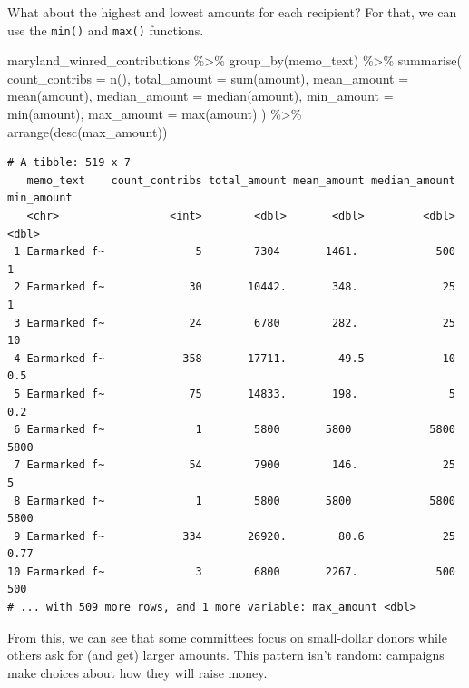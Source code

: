 \documentclass[
  letterpaper,
  DIV=11,
  numbers=noendperiod]{scrreprt}
\newenvironment{Shaded}{\begin{snugshade}}{\end{snugshade}}
\newcommand{\AttributeTok}[1]{\textcolor[rgb]{0.40,0.45,0.13}{#1}}
\newcommand{\FunctionTok}[1]{\textcolor[rgb]{0.28,0.35,0.67}{#1}}
\newcommand{\NormalTok}[1]{\textcolor[rgb]{0.00,0.23,0.31}{#1}}
\newcommand{\SpecialCharTok}[1]{\textcolor[rgb]{0.37,0.37,0.37}{#1}}
\begin{document}
What about the highest and lowest amounts for each recipient? For that,
we can use the \texttt{min()} and \texttt{max()} functions.

\begin{Shaded}
\begin{Highlighting}[]
\NormalTok{maryland\_winred\_contributions }\SpecialCharTok{\%\textgreater{}\%}
  \FunctionTok{group\_by}\NormalTok{(memo\_text) }\SpecialCharTok{\%\textgreater{}\%}
  \FunctionTok{summarise}\NormalTok{(}
    \AttributeTok{count\_contribs =} \FunctionTok{n}\NormalTok{(),}
    \AttributeTok{total\_amount =} \FunctionTok{sum}\NormalTok{(amount),}
    \AttributeTok{mean\_amount =} \FunctionTok{mean}\NormalTok{(amount),}
    \AttributeTok{median\_amount =} \FunctionTok{median}\NormalTok{(amount),}
    \AttributeTok{min\_amount =} \FunctionTok{min}\NormalTok{(amount),}
    \AttributeTok{max\_amount =} \FunctionTok{max}\NormalTok{(amount)}
\NormalTok{  ) }\SpecialCharTok{\%\textgreater{}\%}
  \FunctionTok{arrange}\NormalTok{(}\FunctionTok{desc}\NormalTok{(max\_amount))}
\end{Highlighting}
\end{Shaded}

\begin{verbatim}
# A tibble: 519 x 7
   memo_text    count_contribs total_amount mean_amount median_amount min_amount
   <chr>                 <int>        <dbl>       <dbl>         <dbl>      <dbl>
 1 Earmarked f~              5        7304       1461.            500       1   
 2 Earmarked f~             30       10442.       348.             25       1   
 3 Earmarked f~             24        6780        282.             25      10   
 4 Earmarked f~            358       17711.        49.5            10       0.5 
 5 Earmarked f~             75       14833.       198.              5       0.2 
 6 Earmarked f~              1        5800       5800            5800    5800   
 7 Earmarked f~             54        7900        146.             25       5   
 8 Earmarked f~              1        5800       5800            5800    5800   
 9 Earmarked f~            334       26920.        80.6            25       0.77
10 Earmarked f~              3        6800       2267.            500     500   
# ... with 509 more rows, and 1 more variable: max_amount <dbl>
\end{verbatim}

From this, we can see that some committees focus on small-dollar donors
while others ask for (and get) larger amounts. This pattern isn't
random: campaigns make choices about how they will raise money.
\end{document}
